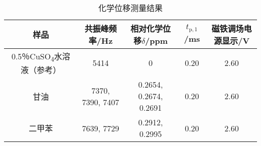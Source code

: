 \begin{table}[htbp!]
	\centering
	\caption{化学位移测量结果\label{tab:cs}}\begin{tabular}{c||c|c|c|c}
		\hline\hline
		样品 & 共振峰频率/Hz & 相对化学位移$\delta$/ppm & $t_{\mathrm{p,1}}$/ms & 磁铁调场电源显示/V\\		\hline\hline
		0.5％CuSO\textsubscript{4}水溶液（参考） & 5414 & 0 & 0.20 & 2.60\\		\hline
		甘油 & 7370, 7390, 7407 & 0.2654, 0.2674, 0.2691 & 0.20 & 2.60\\		\hline
		二甲苯 & 7639, 7729 & 0.2912, 0.2995 & 0.20 & 2.60\\		\hline\hline
	\end{tabular}
\end{table}